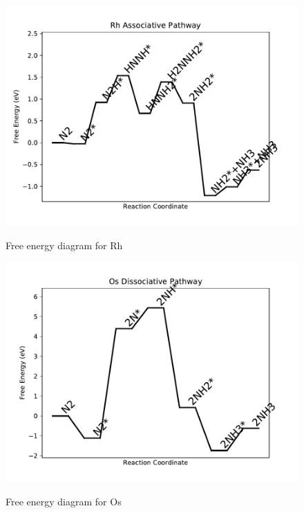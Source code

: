 \documentclass{article}
\begin{document}
\newpage
\begin{figure}
\includegraphics[width=1\linewidth]{data/plots/Rh_associative.pdf}
\label{fig:Rh_associative}
\caption{Free energy diagram for Rh}
\end{figure}

\begin{figure}
\includegraphics[width=1\linewidth]{data/plots/Os_dissociative.pdf}
\label{fig:Os_dissociative}
\caption{Free energy diagram for Os}
\end{figure}
\end{document}

